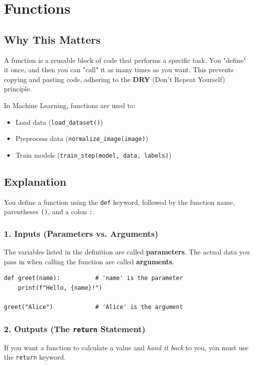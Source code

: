 \chapter{Functions}

\section{Why This Matters}
A function is a reusable block of code that performs a specific task. You "define" it once, and then you can "call" it as many times as you want. This prevents copying and pasting code, adhering to the \textbf{DRY} (Don't Repeat Yourself) principle.

In Machine Learning, functions are used to:
\begin{itemize}
    \item Load data (\texttt{load\_dataset()})
    \item Preprocess data (\texttt{normalize\_image(image)})
    \item Train models (\texttt{train\_step(model, data, labels)})
\end{itemize}

\section{Explanation}
You define a function using the \texttt{def} keyword, followed by the function name, parentheses \texttt{()}, and a colon \texttt{:}. 

\subsection{1. Inputs (Parameters vs. Arguments)}
The variables listed in the definition are called \textbf{parameters}. The actual data you pass in when calling the function are called \textbf{arguments}.

\begin{lstlisting}
def greet(name):          # 'name' is the parameter
    print(f"Hello, {name}!")

greet("Alice")            # 'Alice' is the argument
\end{lstlisting}

\subsection{2. Outputs (The \texttt{return} Statement)}
If you want a function to calculate a value and \textit{hand it back} to you, you must use the \texttt{return} keyword. 

